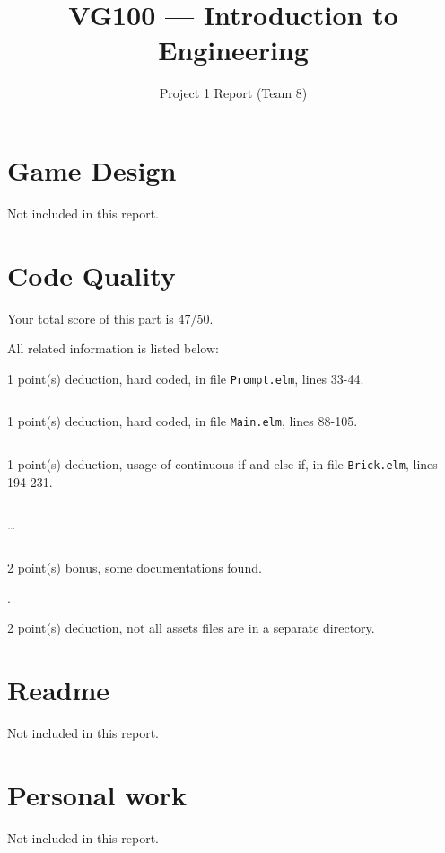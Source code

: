 \documentclass{article}
\title{VG100 --- Introduction to\\ Engineering}
\subtitle{Project 1 Report (Team 8)}
\begin{document}
\maketitle

\section{Game Design}

Not included in this report.

\section{Code Quality}

Your total score of this part is 47/50. \medskip

All related information is listed below: \medskip

1 point(s) {\color{red}deduction}, hard coded, in file {\color{blue}\texttt{Prompt.elm}}, lines {\color{blue}33-44}.

\inputminted[firstline=33,lastline=44]{elm}{Prompt.elm}

1 point(s) {\color{red}deduction}, hard coded, in file {\color{blue}\texttt{Main.elm}}, lines {\color{blue}88-105}.

\inputminted[firstline=88,lastline=105]{elm}{Main.elm}

1 point(s) {\color{red}deduction}, usage of continuous if and else if, in file {\color{blue}\texttt{Brick.elm}}, lines {\color{blue}194-231}.

\inputminted[firstline=194,lastline=203]{elm}{Brick.elm}

\dots

\inputminted[firstline=222,lastline=231]{elm}{Brick.elm}

2 point(s) {\color{red}bonus}, some documentations found.\medskip

.\medskip

2 point(s) {\color{red}deduction}, not all assets files are in a separate directory.\medskip



\newpage

\section{Readme}

Not included in this report.

\section{Personal work}

Not included in this report.


\newpage
\end{document}
